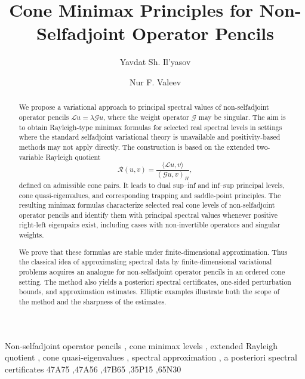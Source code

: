 \documentclass[preprint,10pt]{elsarticle}
\theoremstyle{plain}
\theoremstyle{definition}
\theoremstyle{remark}
\begin{document}
\begin{frontmatter}

\title{Cone Minimax Principles for  Non-Selfadjoint Operator Pencils}

\author[inst1]{Yavdat Sh. Il'yasov}

\author[inst1]{Nur F. Valeev}



\begin{abstract}
We propose a variational approach to principal spectral values of
	non-selfadjoint operator pencils \(\mathcal L u=\lambda\mathcal G u\), where
	the weight operator \(\mathcal G\) may be singular. The aim is to obtain
	Rayleigh-type minimax formulas for selected real spectral levels in settings
	where the standard selfadjoint variational theory is unavailable and
	positivity-based methods may not apply directly. The construction is based on
	the extended two-variable Rayleigh quotient
	\[	\mathcal R(u,v)
	=
	\frac{\langle \mathcal L u,v\rangle}
	{(\mathcal G u,v)_H},\]
		 defined
	on admissible cone pairs. It leads to dual sup--inf and inf--sup principal
	levels, cone quasi-eigenvalues, and corresponding trapping and saddle-point
	principles. The resulting minimax formulas characterize selected real cone
	levels of non-selfadjoint operator pencils and identify them with principal
	spectral values whenever positive right-left eigenpairs exist, including
	cases with non-invertible operators and singular weights.
	
	We prove that these formulas are stable under finite-dimensional
	approximation. Thus the classical idea of approximating spectral data by
	finite-dimensional variational problems acquires an analogue for
	non-selfadjoint operator pencils in an ordered cone setting. The method also
	yields a posteriori spectral certificates, one-sided perturbation bounds, and
	approximation estimates. Elliptic examples illustrate both the scope of the
	method and the sharpness of the estimates.
\end{abstract}

\begin{keyword}
Non-selfadjoint operator pencils \sep
cone minimax levels \sep
extended Rayleigh quotient \sep
cone quasi-eigenvalues \sep
spectral approximation \sep
a posteriori spectral certificates
\MSC[2020] 47A75 \sep 47A56 \sep 47B65 \sep 35P15 \sep 65N30
\end{keyword}

\end{frontmatter}
\end{document}

